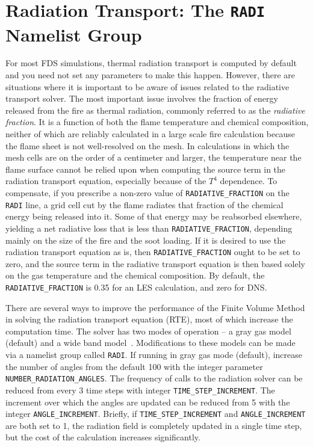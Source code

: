 \documentclass[11pt]{book}
\newcommand{\ct}{\tt\small}
\begin{document}
\section{Radiation Transport: The \texorpdfstring{{\tt RADI}}{RADI} Namelist Group}
\label{info:RADI}

For most FDS simulations, thermal radiation transport is computed by default and you need not set any
parameters to make this happen. However, there are situations where it is important to be aware of
issues related to the radiative transport solver. The most important issue involves the fraction of energy released from the
fire as thermal radiation, commonly referred to as the {\em radiative fraction}. It is a function of both the flame temperature
and chemical composition, neither of which are reliably calculated in a large
scale fire calculation because the flame sheet is not well-resolved on the mesh.
In calculations in which the mesh cells are on the order of a centimeter and
larger, the temperature near the flame surface cannot be relied upon when
computing the source term in the radiation transport equation, especially
because of the $T^4$ dependence.
To compensate, if you prescribe a non-zero
value of {\ct RADIATIVE\_FRACTION} on the {\ct RADI} line, a grid cell cut by the flame
radiates that fraction of the chemical energy being released into it.
Some of that energy may be reabsorbed elsewhere, yielding a net radiative
loss that is less than {\ct RADIATIVE\_FRACTION}, depending mainly on the size of
the fire and the soot loading. If it is desired to use the radiation transport
equation as is, then {\ct RADIATIVE\_FRACTION} ought to be set to zero,
and the source term in the radiative transport equation is then based solely
on the gas temperature and the chemical composition. By default, the {\ct RADIATIVE\_FRACTION} is
0.35 for an LES calculation, and zero for DNS.

There are several ways to improve the performance of the Finite Volume
Method in solving the radiation transport equation (RTE), most of which
increase the computation time. The solver has two modes of
operation -- a gray gas model (default) and a wide band model~\cite{FDS_Tech_Guide_4}.
Modifications to these models can be made via a namelist group called
{\ct RADI}. If running in gray gas mode (default), increase the number
of angles from the default 100 with the integer parameter
{\ct NUMBER\_RADIATION\_ANGLES}. The frequency of calls to the radiation
solver can be reduced from every 3 time steps with integer
{\ct TIME\_STEP\_INCREMENT}. The increment over which the angles are
updated can be reduced from 5 with the integer {\ct ANGLE\_INCREMENT}.
Briefly, if {\ct TIME\_STEP\_INCREMENT} and {\ct ANGLE\_INCREMENT} are
both set to 1, the radiation field is completely updated in a single
time step, but the cost of the calculation increases significantly.
\end{document}
